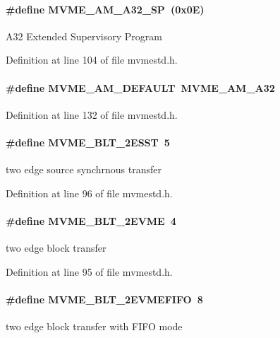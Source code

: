 \paragraph[{MVME\_\-AM\_\-A32\_\-SP}]{\setlength{\rightskip}{0pt plus 5cm}\#define MVME\_\-AM\_\-A32\_\-SP~(0x0E)}\hfill\label{group__mvmestdinclude_gab1a3c7875d40430fa853e67739c78371}
A32 Extended Supervisory Program 

Definition at line 104 of file mvmestd.h.
\paragraph[{MVME\_\-AM\_\-DEFAULT}]{\setlength{\rightskip}{0pt plus 5cm}\#define MVME\_\-AM\_\-DEFAULT~MVME\_\-AM\_\-A32}\hfill\label{group__mvmestdinclude_ga481a89249ecd693bee64d828f9be9ebd}


Definition at line 132 of file mvmestd.h.
\paragraph[{MVME\_\-BLT\_\-2ESST}]{\setlength{\rightskip}{0pt plus 5cm}\#define MVME\_\-BLT\_\-2ESST~5}\hfill\label{group__mvmestdinclude_gab2a0692732d5c4514218c4eeb9257567}
two edge source synchrnous transfer 

Definition at line 96 of file mvmestd.h.
\paragraph[{MVME\_\-BLT\_\-2EVME}]{\setlength{\rightskip}{0pt plus 5cm}\#define MVME\_\-BLT\_\-2EVME~4}\hfill\label{group__mvmestdinclude_gac50f921d73b6b2e78540d734bed2cf05}
two edge block transfer 

Definition at line 95 of file mvmestd.h.
\paragraph[{MVME\_\-BLT\_\-2EVMEFIFO}]{\setlength{\rightskip}{0pt plus 5cm}\#define MVME\_\-BLT\_\-2EVMEFIFO~8}\hfill\label{group__mvmestdinclude_ga2b64419d5ad7dc206d4b4005368e6651}
two edge block transfer with FIFO mode 

